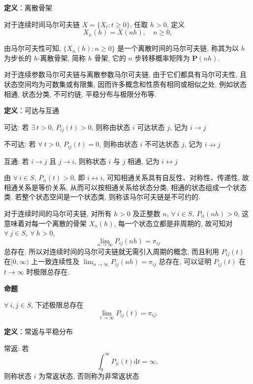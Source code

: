 \documentclass[openany]{ctexbook}
\theoremstyle{kaiti}
\theoremstyle{normal}
\begin{document}
\textbf{定义}：离散骨架

对于连续时间马尔可夫链 $X=\{X_t:t\geqslant0\}$, 任取 $h>0$, 定义
\begin{equation}
  X_n(h)=X(nh),\quad n\geqslant0,
\end{equation}

由马尔可夫性可知, $\{X_n(h):n\geqslant0\}$ 是一个离散时间的马尔可夫链, 称其为以 $h$ 为步长的 $h$-离散骨架, 简称 $h$ 骨架, 它的 $n$ 步转移概率矩阵为 $\bm{P}(nh)$.

对于连续参数马尔可夫链与离散参数马尔可夫链, 由于它们都具有马尔可夫性, 且状态空间均为可数集或有限集, 因而许多概念和性质有相同或相似之处, 例如状态相通, 状态分类, 不可约链, 平稳分布与极限分布等.

\textbf{定义}：可达与互通

可达: 若 $\exists~t>0$, $P_{ij}(t)>0$, 则称由状态 $i$ 可达状态 $j$, 记为 $i\to j$

不可达: 若 $\forall~t>0$, $P_{ij}(t)=0$, 则称由状态 $i$ 不可达状态 $j$, 记为 $i\nrightarrow j$

互通: 若 $i\to j$ 且 $j\to i$, 则称状态 $i$ 与 $j$ 相通, 记为 $i\leftrightarrow j$

由 $\forall~i\in S$, $P_{ii}(t)>0$, 即 $i\leftrightarrow i$, 可知相通关系具有自反性、对称性、传递性, 故相通关系是等价关系, 从而可以按相通关系给状态分类, 相通的状态组成一个状态类. 若整个状态空间是一个状态类, 则称该马尔可夫链是不可约的.

对于连续时间的马尔可夫链, 对所有 $h>0$ 及正整数 $n$, $\forall~i\in S,~P_{ii}(nh)>0$, 这意味着对每一个离散的骨架 $X_n(h)$, 每一个状态立都是非周期的, 故可知对 $\forall~j\in S,~\forall~h>0$,
\begin{equation}
  \lim_{n\to\infty}P_{ij}(nh)=\pi_{ij}
\end{equation}
 总存在. 所以对连续时间的马尔可夫链就无需引入周期的概念, 而且利用 $P_{ij}(t)$ 在$[0,\infty)$ 上一致连续性及 $\lim_{n\to\infty}P_{ij}(nh)=\pi_{ij}$ 总存在, 可以证明 $P_{ij}(t)$ 在 $t\to\infty$ 时极限总存在.

\textbf{命题}

$\forall~i,j\in S$, 下述极限总存在
\begin{equation}
  \lim_{t\to\infty}P_{ij}(t)=\pi_{ij}.
\end{equation}

\textbf{定义}：常返与平稳分布

常返: 若
\begin{equation}
  \int_0^\infty P_{ii}(t)\mathrm{d}t=\infty,
\end{equation} 则称状态 $i$ 为常返状态, 否则称为非常返状态
\end{document}
